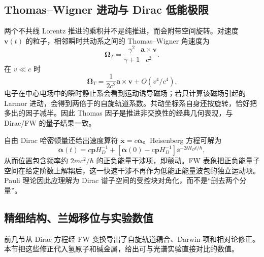 \subsection{Thomas--Wigner 进动与 Dirac 低能极限}

两个不共线 Lorentz 推进的乘积并不是纯推进，而会附带空间旋转。对速度 $\mathbf v(t)$ 的粒子，相邻瞬时共动系之间的 Thomas--Wigner 角速度为
\begin{equation}
\boldsymbol\Omega_T
=\frac{\gamma^2}{\gamma+1}
\frac{\mathbf a\times\mathbf v}{c^2}.
\label{eq:thomas-exact}
\end{equation}
在 $v\ll c$ 时
\begin{equation}
\boldsymbol\Omega_T
=\frac{1}{2c^2}\mathbf a\times\mathbf v
+O(v^4/c^4).
\label{eq:thomas-nonrel}
\end{equation}
电子在中心电场中的瞬时静止系会看到运动诱导磁场；若只计算该磁场引起的 Larmor 进动，会得到两倍于的自旋轨道系数。共动坐标系自身还按旋转，恰好把多出的因子减半。因此 Thomas 因子是推进非交换性的经典几何表现，与 Dirac/FW 的量子结果一致。

自由 Dirac 哈密顿量还给出速度算符 $\dot{\mathbf x}=c\boldsymbol\alpha$。Heisenberg 方程可解为
\begin{equation}
\boldsymbol\alpha(t)
=c\mathbf pH_D^{-1}
+\left[\boldsymbol\alpha(0)-c\mathbf pH_D^{-1}\right]
\ee^{-2\ii H_Dt/\hbar},
\label{eq:alpha-zitter}
\end{equation}
从而位置包含频率约 $2mc^2/\hbar$ 的正负能量干涉项，即颤动。FW 表象把正负能量子空间在给定阶数上解耦后，这一快速干涉不再作为低能正能量波包的独立运动项。Pauli 理论因此应理解为 Dirac 谱子空间的受控块对角化，而不是“删去两个分量”。

\subsection{精细结构、兰姆移位与实验数值}
\label{sec:rel-fine-structure-experiment}

前几节从 Dirac 方程经 FW 变换导出了自旋轨道耦合、Darwin 项和相对论修正。本节把这些修正代入氢原子和碱金属，给出可与光谱实验直接对比的数值。


